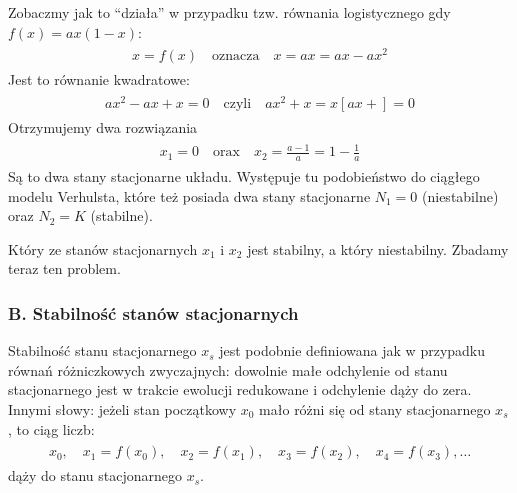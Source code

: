 \documentclass[a4paper,12pt,polish]{sphinxmanual}
\begin{document}
Zobaczmy jak to ``działa'' w przypadku tzw. równania logistycznego gdy $f(x) = ax (1-x)$:
\label{ch1/chI031:equation-eqn12}\begin{gather}
\begin{split}x = f(x) \quad \mbox{oznacza} \quad x=ax  = ax - ax^2\end{split}\label{ch1/chI031-eqn12}
\end{gather}
Jest to równanie kwadratowe:
\label{ch1/chI031:equation-eqn13}\begin{gather}
\begin{split}ax^2 -ax +x = 0 \quad \mbox{czyli} \quad  ax^2 + x  =  x [ax + ] = 0\end{split}\label{ch1/chI031-eqn13}
\end{gather}
Otrzymujemy dwa rozwiązania
\label{ch1/chI031:equation-eqn14}\begin{gather}
\begin{split}x_1 = 0 \quad \mbox{orax} \quad x_2 = \frac{a-1}{a} = 1 - \frac{1}{a}\end{split}\label{ch1/chI031-eqn14}
\end{gather}
Są to dwa stany stacjonarne układu. Występuje tu podobieństwo do ciągłego modelu Verhulsta, które też posiada dwa stany stacjonarne $N_1 = 0$ (niestabilne)  oraz $N_2 = K$ (stabilne).

Który ze stanów stacjonarnych  $x_1$   i   $x_2$  jest stabilny, a który niestabilny.  Zbadamy teraz ten problem.


\subsubsection{B. Stabilność stanów stacjonarnych}
\label{ch1/chI031:b-stabilnosc-stanow-stacjonarnych}
Stabilność stanu stacjonarnego $x_s$  jest podobnie definiowana jak w przypadku równań różniczkowych zwyczajnych: dowolnie małe odchylenie od stanu stacjonarnego   jest w trakcie ewolucji redukowane i odchylenie dąży do zera. Innymi słowy: jeżeli stan początkowy $x_0$ mało różni się od stany stacjonarnego $x_s$, to ciąg liczb:
\label{ch1/chI031:equation-eqn15}\begin{gather}
\begin{split}x_0, \quad x_1=f(x_0), \quad x_2 = f(x_1), \quad x_3 = f(x_2), \quad x_4 = f(x_3), \dots\end{split}\label{ch1/chI031-eqn15}
\end{gather}
dąży do stanu stacjonarnego $x_s$.
\end{document}
